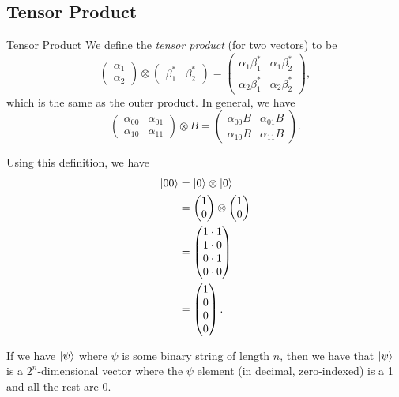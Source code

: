 \documentclass[class=article, crop=false]{standalone}
\begin{document}
  \subsection{Tensor Product}
  \begin{definition}{Tensor Product}
    We define the \emph{tensor product} (for two vectors) to be
    \[
      \begin{pmatrix}
        \alpha_1 \\
        \alpha_2
      \end{pmatrix}\otimes \begin{pmatrix}
        \beta_1^* & \beta_2^*
      \end{pmatrix} = \begin{pmatrix}
        \alpha_1\beta_1^* & \alpha_1\beta_2^* \\
        \alpha_2\beta_1^* & \alpha_2\beta_2^*
      \end{pmatrix},
    \]
    which is the same as the outer product. In general, we have
    \[
      \begin{pmatrix}
        \alpha_{00} & \alpha_{01} \\
        \alpha_{10} & \alpha_{11}
      \end{pmatrix}\otimes B = \begin{pmatrix}
        \alpha_{00}B & \alpha_{01}B \\
        \alpha_{10}B & \alpha_{11}B
      \end{pmatrix}.
    \]
  \end{definition}
  Using this definition, we have
  \begin{align*}
    \left\lvert 00 \right\rangle &= \left\lvert 0 \right\rangle\otimes \left\lvert 0 \right\rangle \\
             &= \begin{pmatrix}
              1 \\
              0
             \end{pmatrix} \otimes \begin{pmatrix}
              1 \\
              0
             \end{pmatrix} \\
             &= \begin{pmatrix}
              1\cdot 1 \\
              1\cdot 0 \\
              0\cdot 1 \\
              0\cdot 0
             \end{pmatrix} \\
             &= \begin{pmatrix}
              1 \\
              0 \\
              0 \\
              0
             \end{pmatrix}.
  \end{align*}
  \begin{note}{}
    If we have $\left\lvert \psi \right\rangle$ where $\psi$ is some binary string of length $n$, then we have that $\left\lvert \psi \right\rangle$ is a $2^n$-dimensional vector where the $\psi$ element (in decimal, zero-indexed) is a 1 and all the rest are 0.
  \end{note}
\end{document}

